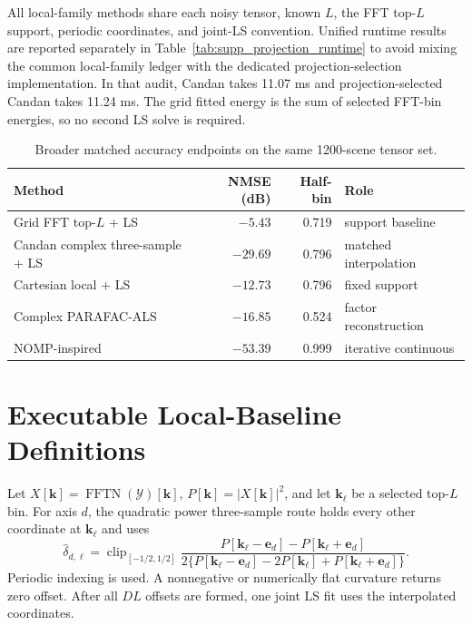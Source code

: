 \documentclass[11pt,onecolumn]{IEEEtran}
\begin{document}


All local-family methods share each noisy tensor, known $L$, the FFT top-$L$
support, periodic coordinates, and joint-LS convention. Unified runtime results
are reported separately in Table~\ref{tab:supp_projection_runtime} to avoid
mixing the common local-family ledger with the dedicated projection-selection
implementation. In that audit, Candan takes 11.07 ms and projection-selected
Candan takes 11.24 ms. The grid fitted energy is the sum of selected FFT-bin
energies, so no second LS solve is required.



\begin{table}[!ht]
\centering
\caption{Broader matched accuracy endpoints on the same 1200-scene tensor set.}
\label{tab:supp_broader}
\footnotesize
\begin{tabular}{lrrl}
\toprule
Method & NMSE (dB) & Half-bin & Role \\
\midrule
Grid FFT top-$L$ + LS & $-5.43$ & 0.719 & support baseline \\
Candan complex three-sample + LS & $-29.69$ & 0.796 & matched interpolation \\
Cartesian local + LS & $-12.73$ & 0.796 & fixed support \\
Complex PARAFAC-ALS & $-16.85$ & 0.524 & factor reconstruction \\
NOMP-inspired & $-53.39$ & 0.999 & iterative continuous \\
\bottomrule
\end{tabular}
\end{table}

\section{Executable Local-Baseline Definitions}

Let $X[\mathbf{k}]=\operatorname{FFTN}(\mathcal{Y})[\mathbf{k}]$,
$P[\mathbf{k}]=|X[\mathbf{k}]|^2$, and
let $\mathbf{k}_\ell$ be a selected top-$L$ bin. For axis $d$, the
quadratic power three-sample route holds every other coordinate at $\mathbf{k}_\ell$ and uses
\begin{equation}
 \widehat{\delta}_{d,\ell}
 =\operatorname{clip}_{[-1/2,1/2]}
 \frac{P[\mathbf{k}_\ell-\mathbf{e}_d]
       -P[\mathbf{k}_\ell+\mathbf{e}_d]}
 {2\{P[\mathbf{k}_\ell-\mathbf{e}_d]
       -2P[\mathbf{k}_\ell]
       +P[\mathbf{k}_\ell+\mathbf{e}_d]\}}.
 \label{eq:supp_three_sample}
\end{equation}
Periodic indexing is used. A nonnegative or numerically flat curvature
returns zero offset. After all $DL$ offsets are formed, one joint LS fit uses
the interpolated coordinates.
\end{document}
